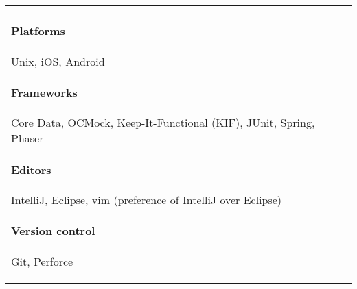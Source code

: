 \documentclass[letterpaper,10pt]{article} %
\begin{document}
\begin{tabular}{ll}
\begin{minipage}[t]{3.75in}
        \paragraph{Platforms} Unix, iOS, Android
        \paragraph{Frameworks} Core Data, OCMock, Keep-It-Functional (KIF), JUnit, {\footnotesize Spring, Phaser}
        \paragraph{Editors} IntelliJ, Eclipse, vim {\footnotesize (preference of IntelliJ over Eclipse)}
        \paragraph{Version control} Git, Perforce
    \end{minipage}
\end{tabular}
\end{document}
